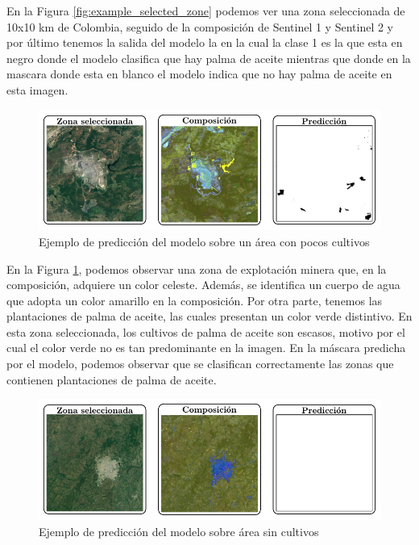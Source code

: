 En la Figura \ref{fig:example_selected_zone} podemos ver una zona seleccionada de 10x10 km de Colombia, seguido de la composición de Sentinel 1 y Sentinel 2 y por último tenemos la salida del modelo la en la cual la clase 1 es la que esta en negro donde el modelo clasifica que hay palma de aceite mientras que donde en la mascara donde esta en blanco el modelo indica que no hay palma de aceite en esta imagen.

\begin{figure}[t]
 \centering
 \includegraphics[width=\textwidth]{example_few_crops}
 \caption{Ejemplo de predicción del modelo sobre un área con pocos cultivos}
 \label{fig:example_few_crops}
\end{figure}

En la Figura \ref{fig:example_few_crops}, podemos observar una zona de explotación minera que, en la composición, adquiere un color celeste. Además, se identifica un cuerpo de agua que adopta un color amarillo en la composición. Por otra parte, tenemos las plantaciones de palma de aceite, las cuales presentan un color verde distintivo. En esta zona seleccionada, los cultivos de palma de aceite son escasos, motivo por el cual el color verde no es tan predominante en la imagen. En la máscara predicha por el modelo, podemos observar que se clasifican correctamente las zonas que contienen plantaciones de palma de aceite.

\begin{figure}[t]
 \centering
 \includegraphics[width=\textwidth]{example_without_crops}
 \caption{Ejemplo de predicción del modelo sobre área sin cultivos}
 \label{fig:example_without_crops}
\end{figure}

